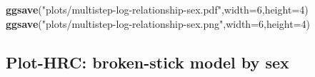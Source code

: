 \documentclass[
]{article}
\newenvironment{Shaded}{\begin{snugshade}}{\end{snugshade}}
\newcommand{\DataTypeTok}[1]{\textcolor[rgb]{0.13,0.29,0.53}{#1}}
\newcommand{\DecValTok}[1]{\textcolor[rgb]{0.00,0.00,0.81}{#1}}
\newcommand{\KeywordTok}[1]{\textcolor[rgb]{0.13,0.29,0.53}{\textbf{#1}}}
\newcommand{\NormalTok}[1]{#1}
\newcommand{\StringTok}[1]{\textcolor[rgb]{0.31,0.60,0.02}{#1}}
\begin{document}
\begin{Shaded}
\begin{Highlighting}[]
\KeywordTok{ggsave}\NormalTok{(}\StringTok{"plots/multistep-log-relationship-sex.pdf"}\NormalTok{,}\DataTypeTok{width=}\DecValTok{6}\NormalTok{,}\DataTypeTok{height=}\DecValTok{4}\NormalTok{)}
\KeywordTok{ggsave}\NormalTok{(}\StringTok{"plots/multistep-log-relationship-sex.png"}\NormalTok{,}\DataTypeTok{width=}\DecValTok{6}\NormalTok{,}\DataTypeTok{height=}\DecValTok{4}\NormalTok{)}
\end{Highlighting}
\end{Shaded}

\hypertarget{plot-hrc-broken-stick-model-by-sex}{%
\subsection{Plot-HRC: broken-stick model by
sex}\label{plot-hrc-broken-stick-model-by-sex}}
\end{document}
